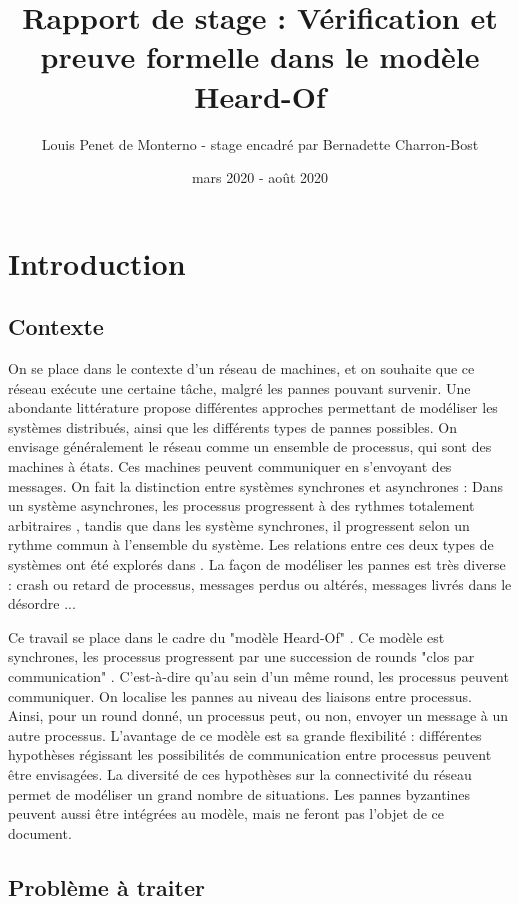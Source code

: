 \documentclass{article}
\title{Rapport de stage : Vérification et preuve formelle dans le modèle Heard-Of}
\date{mars 2020 - août 2020}
\author{Louis Penet de Monterno - stage encadré par Bernadette Charron-Bost}
\begin{document}
\maketitle
\tableofcontents
\newpage

\section{Introduction}

\subsection{Contexte}

On se place dans le contexte d'un réseau de machines, et on souhaite que ce réseau exécute une certaine tâche, malgré les pannes pouvant survenir.
Une abondante littérature propose différentes approches permettant de modéliser les systèmes distribués, ainsi que les différents types de pannes possibles.
On envisage généralement le réseau comme un ensemble de processus, qui sont des machines à états. Ces machines peuvent communiquer en s'envoyant des messages.
On fait la distinction entre systèmes synchrones et asynchrones :
Dans un système asynchrones, les processus progressent à des rythmes totalement arbitraires \cite{flp} \cite{ben_or}, tandis que dans les système synchrones, 
il progressent selon un rythme commun à l'ensemble du système.
Les relations entre ces deux types de systèmes ont été explorés dans \cite{partial_sync} \cite{gafni}.
La façon de modéliser les pannes est très diverse : crash ou retard de processus, messages perdus ou altérés, messages livrés dans le désordre ...

Ce travail se place dans le cadre du "modèle Heard-Of" \cite{model_ho}.
Ce modèle est synchrones, les processus progressent par une succession de rounds "clos par communication" \cite{closed_communic} .
C'est-à-dire qu'au sein d'un même round, les processus peuvent communiquer.
On localise les pannes au niveau des liaisons entre processus. Ainsi, pour un round donné, un processus peut, ou non, envoyer un message à un autre processus.
L'avantage de ce modèle est sa grande flexibilité : différentes hypothèses régissant les possibilités de communication entre processus peuvent être envisagées.
La diversité de ces hypothèses sur la connectivité du réseau permet de modéliser un grand nombre de situations.
Les pannes byzantines peuvent aussi être intégrées au modèle, mais ne feront pas l'objet de ce document.

\subsection{Problème à traiter}
\end{document}
